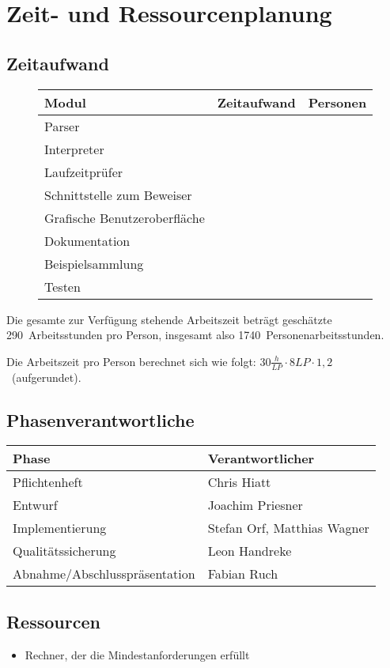 \section{Zeit- und Ressourcenplanung}%

\subsection{Zeitaufwand}%

\begin{figure}[H]
  \begin{tabular}{| l | l | l | }
    \hline
    \textbf{Modul} & \textbf{Zeitaufwand} & \textbf{Personen} \\ \hline
    Parser &  &  \\ \hline
    Interpreter &  &  \\ \hline
    Laufzeitprüfer &  &  \\ \hline
    Schnittstelle zum Beweiser &  &  \\ \hline
    Grafische Benutzeroberfläche &  &  \\ \hline
    Dokumentation &  &  \\ \hline
    Beispielsammlung &  &  \\ \hline
    Testen &  &  \\ \hline %
  \end{tabular}
\end{figure}

Die gesamte zur Verfügung stehende Arbeitszeit beträgt geschätzte 290~Arbeitsstunden pro Person, insgesamt also 1740~Personenarbeitsstunden.

Die Arbeitszeit pro Person berechnet sich wie folgt: $30\frac{h}{LP} \cdot 8LP \cdot 1,2$~(aufgerundet).

\subsection{Phasenverantwortliche}%

  \begin{tabular}{| l | l | }
    \hline
    \textbf{Phase} & \textbf{Verantwortlicher} \\ \hline
    Pflichtenheft & Chris Hiatt \\ \hline
    Entwurf & Joachim Priesner \\ \hline
    Implementierung & Stefan Orf, Matthias Wagner \\ \hline
    Qualitätssicherung & Leon Handreke \\ \hline
    Abnahme/Abschlusspräsentation & Fabian Ruch \\ \hline
  \end{tabular}

\subsection{Ressourcen}%

\begin{itemize}%
    \item Rechner, der die Mindestanforderungen erfüllt
\end{itemize}%
